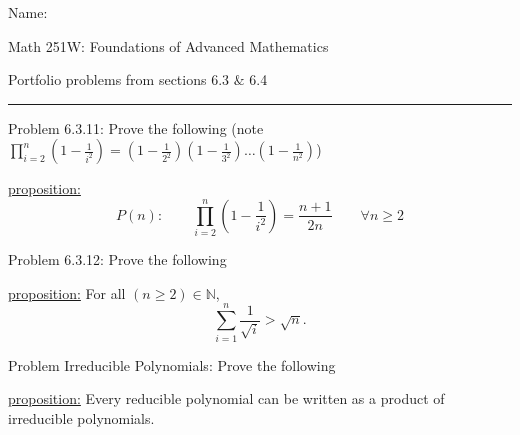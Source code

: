 \documentclass{article}
\theoremstyle{definition}
\newcommand{\N}{\mathbb{N}}
\begin{document}
	\begin{center}
		\hfill Name: \underline{\hspace{3cm}}

		\medskip

		\Large{Math 251W: Foundations of Advanced Mathematics}

		\normalsize Portfolio problems from sections 6.3
		$\&$ 6.4 \hrule \vspace{0.4cm}


		\vspace{0.75cm}
	\end{center}



	\noindent Problem 6.3.11: Prove the following (note $\prod_{i=2}^n\left(1-\frac{1}{i^2}\right)=\left(1-\frac{1}{2^2}\right)\left(1-\frac{1}{3^2}\right)\dots\left(1-\frac{1}{n^2}\right)$)\vspace{0.3cm}


	\underline{proposition:}
	$$P(n):\qquad  \prod_{i=2}^n\left(1-\frac{1}{i^2}\right)=\frac{n+1}{2n}\qquad \forall n\ge 2$$
	\vspace{.2cm}

	\vspace{1cm}



	\noindent Problem 6.3.12: Prove the following  \vspace{0.3cm}

	\underline{proposition:} For all $(n\ge2)\in \N$,  $$\sum_{i=1}^n\frac{1}{\sqrt{i}}>\sqrt{n}.$$
	\vspace{0.2cm}

	\vspace{1cm}



	\noindent Problem Irreducible Polynomials: Prove the following  \vspace{0.3cm}

	\underline{proposition:} Every reducible polynomial can be written as a product of irreducible polynomials.

	\vspace{.2cm}

	\vspace{1cm}

\end{document}

